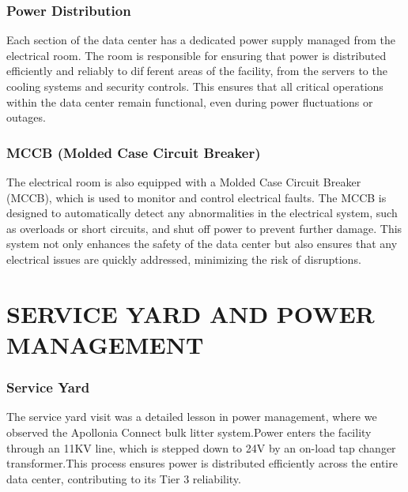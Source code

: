 \documentclass[12pt]{report}
\begin{document}
\begin{flushleft}
\subsection{ Power Distribution}
\begin{justify}
	Each section of the data center has a dedicated power supply managed from the electrical room.
	The room is responsible for ensuring that power is distributed efficiently and reliably to different areas of the facility, from the servers to the cooling systems and security controls. This
	ensures that all critical operations within the data center remain functional, even during power
	fluctuations or outages.
\end{justify}
\subsection{MCCB (Molded Case Circuit Breaker)}
\begin{justify}
	The electrical room is also equipped with a Molded Case Circuit Breaker (MCCB), which is
	used to monitor and control electrical faults. The MCCB is designed to automatically detect any
	abnormalities in the electrical system, such as overloads or short circuits, and shut off power to
	prevent further damage. This system not only enhances the safety of the data center but also
	ensures that any electrical issues are quickly addressed, minimizing the risk of disruptions.
\end{justify}
\chapter{SERVICE YARD AND POWER
	MANAGEMENT}
	\subsection{Service Yard}
	\begin{justify}
		The service yard visit was a detailed lesson in power management, where we observed the
		Apollonia Connect bulk litter system.Power enters the facility through an 11KV line, which
		is stepped down to 24V by an on-load tap changer transformer.This process ensures power is
		distributed efficiently across the entire data center, contributing to its Tier 3 reliability.
	\end{justify}

\end{flushleft}
\end{document}
